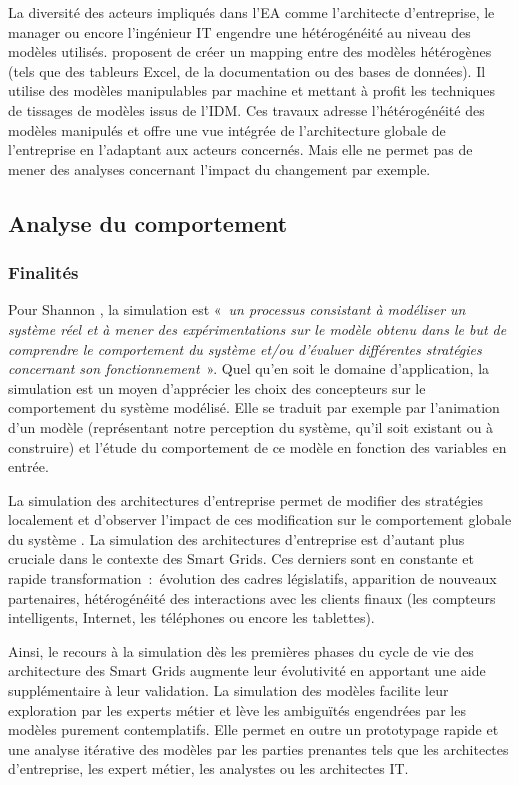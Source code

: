 	La diversité des acteurs impliqués dans l'EA comme l'architecte d'entreprise, 
le manager ou encore l'ingénieur IT engendre une hétérogénéité au niveau des 
modèles utilisés. \cite{bruneliere2013support} proposent de créer un mapping 
entre des modèles hétérogènes (tels que des tableurs Excel, de la documentation 
ou des bases de données). Il utilise des modèles manipulables par machine et 
mettant à profit les techniques de tissages de modèles issus de l'IDM. Ces 
travaux adresse l'hétérogénéité des modèles manipulés et offre une vue intégrée 
de l'architecture globale de l'entreprise en l'adaptant aux acteurs concernés. 
Mais elle ne permet pas de mener des analyses concernant l'impact du changement 
par exemple. 

	
	\subsection{Analyse du comportement}
	\subsubsection{Finalités}
	Pour Shannon \cite{shannon1975systems}, la simulation est 
«~\emph{un processus consistant à modéliser un système réel et à mener des 
expérimentations sur le modèle obtenu dans le but de comprendre le comportement 
du système et/ou d'évaluer différentes stratégies concernant son 
fonctionnement}~». 
Quel qu'en soit le domaine d'application, la simulation est un moyen d'apprécier 
les choix des concepteurs sur le comportement du système modélisé. Elle se 
traduit 
par exemple par l'animation d'un modèle (représentant notre perception du 
système, qu'il soit existant ou à construire) et l'étude du comportement de ce 
modèle en fonction des variables en entrée. 

La simulation des architectures d'entreprise permet de modifier des stratégies 
localement et d'observer l'impact de ces modification sur le comportement 
globale du système \cite{buckl2008towards}. La simulation des architectures 
d'entreprise est d'autant plus cruciale dans le contexte des Smart Grids. Ces 
derniers sont en constante et rapide transformation~:~évolution des cadres 
législatifs, apparition de nouveaux partenaires, hétérogénéité des interactions 
avec les clients finaux (les compteurs intelligents, Internet, les téléphones ou 
encore les tablettes). 

Ainsi, le recours à la simulation dès les premières phases du cycle de vie des 
architecture des Smart Grids augmente leur évolutivité en apportant une aide 
supplémentaire à leur validation. La simulation des modèles facilite leur 
exploration par les experts métier et lève les ambiguïtés engendrées par les 
modèles purement contemplatifs. Elle permet en outre un prototypage rapide et 
une analyse itérative des modèles par les parties prenantes tels que les 
architectes d'entreprise, les expert métier, les analystes ou les architectes 
IT. 

